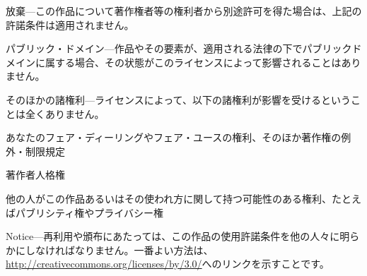 \begin{aosaitemize}

  \item 放棄---この作品について著作権者等の権利者から別途許可を得た場合は、上記の許諾条件は適用されません。

  \item パブリック・ドメイン---作品やその要素が、適用される法律の下でパブリックドメインに属する場合、その状態がこのライセンスによって影響されることはありません。

  \item そのほかの諸権利---ライセンスによって、以下の諸権利が影響を受けるということは全くありません。
    \begin{aosaitemize}

      \item あなたのフェア・ディーリングやフェア・ユースの権利、そのほか著作権の例外・制限規定

      \item 著作者人格権

      \item 他の人がこの作品あるいはその使われ方に関して持つ可能性のある権利、たとえばパブリシティ権やプライバシー権

    \end{aosaitemize}

  \item Notice---再利用や頒布にあたっては、この作品の使用許諾条件を他の人々に明らかにしなければなりません。一番よい方法は、\url{http://creativecommons.org/licenses/by/3.0/}へのリンクを示すことです。

\end{aosaitemize}

